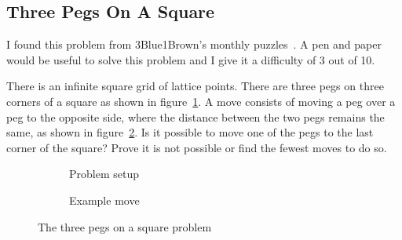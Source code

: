 
\subsection{Three Pegs On A Square}

I found this problem from 3Blue1Brown's monthly puzzles~\cite{ThreePegsOnASquare}. A pen and paper would be useful to solve this problem and I give it a difficulty of 3 out of 10.

There is an infinite square grid of lattice points. There are three pegs on three corners of a square as shown in figure~\ref{fig:ThreePegsOnASquare_Problem}. A move consists of moving a peg over a peg to the opposite side, where the distance between the two pegs remains the same, as shown in figure~\ref{fig:ThreePegsOnASquare_MoveDefinition}. Is it possible to move one of the pegs to the last corner of the square? Prove it is not possible or find the fewest moves to do so.

\def\dotradius{0.05}
\def\pegradius{0.2}

\begin{figure}[H]
	\begin{subfigure}{0.49\textwidth}
		\centering
		\caption{Problem setup}
		\label{fig:ThreePegsOnASquare_Problem}
	\end{subfigure}
	\hfill
	\begin{subfigure}{0.49\textwidth}
		\centering
		\caption{Example move}
		\label{fig:ThreePegsOnASquare_MoveDefinition}
	\end{subfigure}
	\caption{The three pegs on a square problem}
	\label{fig:ThreePegsOnASquare}
\end{figure}

